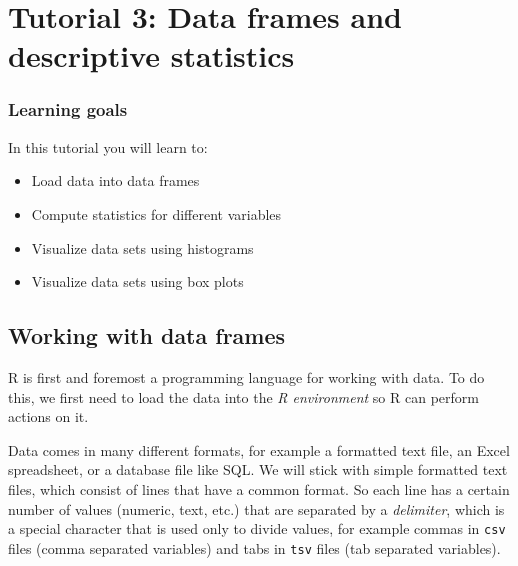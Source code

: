 \documentclass[
  letterpaper,
  DIV=11,
  numbers=noendperiod]{scrreprt}
\providecommand{\tightlist}{%
  \setlength{\itemsep}{0pt}\setlength{\parskip}{0pt}}\usepackage{longtable,booktabs,array}
\begin{document}

\hypertarget{tutorial-3-data-frames-and-descriptive-statistics}{%
\chapter*{Tutorial 3: Data frames and descriptive
statistics}\label{tutorial-3-data-frames-and-descriptive-statistics}}


\hypertarget{learning-goals-2}{%
\subsection*{Learning goals}\label{learning-goals-2}}

In this tutorial you will learn to:

\begin{itemize}
\tightlist
\item
  Load data into data frames
\item
  Compute statistics for different variables
\item
  Visualize data sets using histograms
\item
  Visualize data sets using box plots
\end{itemize}

\hypertarget{working-with-data-frames}{%
\section*{Working with data frames}\label{working-with-data-frames}}


R is first and foremost a programming language for working with data. To
do this, we first need to load the data into the \emph{R environment} so
R can perform actions on it.

Data comes in many different formats, for example a formatted text file,
an Excel spreadsheet, or a database file like SQL. We will stick with
simple formatted text files, which consist of lines that have a common
format. So each line has a certain number of values (numeric, text,
etc.) that are separated by a \emph{delimiter}, which is a special
character that is used only to divide values, for example commas in
\texttt{csv} files (comma separated variables) and tabs in \texttt{tsv}
files (tab separated variables).
\end{document}

